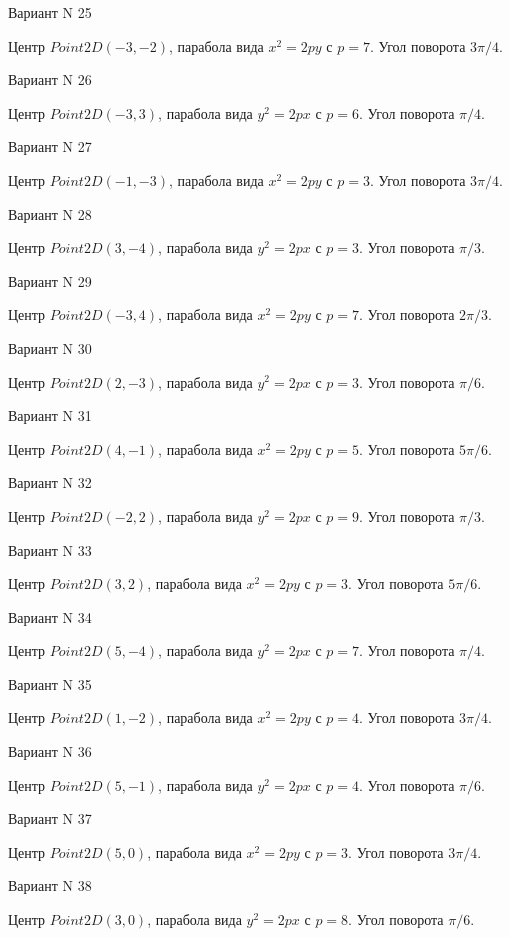 \documentclass[11pt]{report}
\begin{document}
Вариант N 25

Центр $Point2D\left(-3, -2\right)$, парабола вида $x^{2} = 2py$ с $p = 7$. Угол поворота $3 \pi / 4$.

Вариант N 26

Центр $Point2D\left(-3, 3\right)$, парабола вида $y^{2} = 2px$ с $p = 6$. Угол поворота $\pi / 4$.

Вариант N 27

Центр $Point2D\left(-1, -3\right)$, парабола вида $x^{2} = 2py$ с $p = 3$. Угол поворота $3 \pi / 4$.

Вариант N 28

Центр $Point2D\left(3, -4\right)$, парабола вида $y^{2} = 2px$ с $p = 3$. Угол поворота $\pi / 3$.

Вариант N 29

Центр $Point2D\left(-3, 4\right)$, парабола вида $x^{2} = 2py$ с $p = 7$. Угол поворота $2 \pi / 3$.

Вариант N 30

Центр $Point2D\left(2, -3\right)$, парабола вида $y^{2} = 2px$ с $p = 3$. Угол поворота $\pi / 6$.

Вариант N 31

Центр $Point2D\left(4, -1\right)$, парабола вида $x^{2} = 2py$ с $p = 5$. Угол поворота $5 \pi / 6$.

Вариант N 32

Центр $Point2D\left(-2, 2\right)$, парабола вида $y^{2} = 2px$ с $p = 9$. Угол поворота $\pi / 3$.

Вариант N 33

Центр $Point2D\left(3, 2\right)$, парабола вида $x^{2} = 2py$ с $p = 3$. Угол поворота $5 \pi / 6$.

Вариант N 34

Центр $Point2D\left(5, -4\right)$, парабола вида $y^{2} = 2px$ с $p = 7$. Угол поворота $\pi / 4$.

Вариант N 35

Центр $Point2D\left(1, -2\right)$, парабола вида $x^{2} = 2py$ с $p = 4$. Угол поворота $3 \pi / 4$.

Вариант N 36

Центр $Point2D\left(5, -1\right)$, парабола вида $y^{2} = 2px$ с $p = 4$. Угол поворота $\pi / 6$.

Вариант N 37

Центр $Point2D\left(5, 0\right)$, парабола вида $x^{2} = 2py$ с $p = 3$. Угол поворота $3 \pi / 4$.

Вариант N 38

Центр $Point2D\left(3, 0\right)$, парабола вида $y^{2} = 2px$ с $p = 8$. Угол поворота $\pi / 6$.
\end{document}

